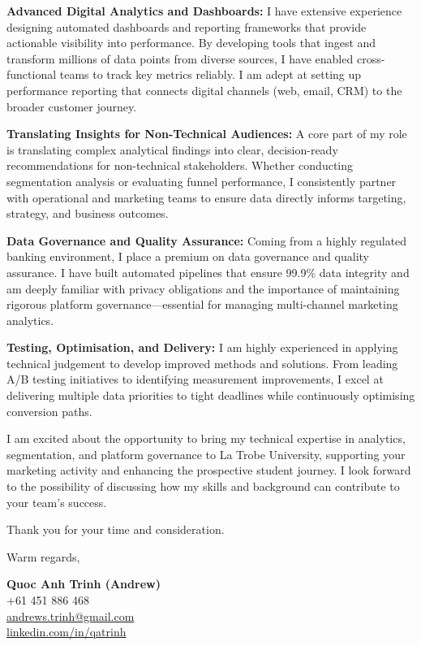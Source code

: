 \documentclass[11pt, a4paper]{article}
\begin{document}
\textbf{Advanced Digital Analytics and Dashboards:}
I have extensive experience designing automated dashboards and reporting frameworks that provide actionable visibility into performance. By developing tools that ingest and transform millions of data points from diverse sources, I have enabled cross-functional teams to track key metrics reliably. I am adept at setting up performance reporting that connects digital channels (web, email, CRM) to the broader customer journey.

\textbf{Translating Insights for Non-Technical Audiences:}
A core part of my role is translating complex analytical findings into clear, decision-ready recommendations for non-technical stakeholders. Whether conducting segmentation analysis or evaluating funnel performance, I consistently partner with operational and marketing teams to ensure data directly informs targeting, strategy, and business outcomes.

\textbf{Data Governance and Quality Assurance:}
Coming from a highly regulated banking environment, I place a premium on data governance and quality assurance. I have built automated pipelines that ensure 99.9\% data integrity and am deeply familiar with privacy obligations and the importance of maintaining rigorous platform governance—essential for managing multi-channel marketing analytics.

\textbf{Testing, Optimisation, and Delivery:}
I am highly experienced in applying technical judgement to develop improved methods and solutions. From leading A/B testing initiatives to identifying measurement improvements, I excel at delivering multiple data priorities to tight deadlines while continuously optimising conversion paths.

I am excited about the opportunity to bring my technical expertise in analytics, segmentation, and platform governance to La Trobe University, supporting your marketing activity and enhancing the prospective student journey. I look forward to the possibility of discussing how my skills and background can contribute to your team's success.

Thank you for your time and consideration.

\vspace{20pt}

Warm regards,

\vspace{30pt}

\textbf{Quoc Anh Trinh (Andrew)}\\
+61 451 886 468\\
\href{mailto:andrews.trinh@gmail.com}{andrews.trinh@gmail.com}\\
\href{https://www.linkedin.com/in/qatrinh}{linkedin.com/in/qatrinh}
\end{document}
